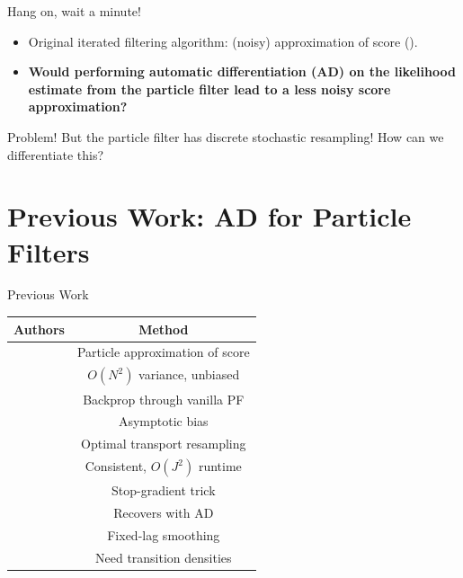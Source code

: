 \documentclass{beamer}
\begin{document}
\begin{frame}{Hang on, wait a minute!}
    \begin{itemize}
        \item Original iterated filtering algorithm: (noisy) approximation of score (\cite{ionides06-pnas}). 
        \pause
        \item \textbf{Would performing automatic differentiation (AD) on the likelihood estimate from the particle filter lead to a less noisy score approximation?}
    \end{itemize}
    \pause
    \begin{block}{Problem!}
        But the particle filter has discrete stochastic resampling! How can we differentiate this?
    \end{block}
\end{frame}

\section{Previous Work: AD for Particle Filters}


\begin{frame}{Previous Work}

    \begin{table}[h!]
        \centering
        \begin{tabular}{||c c||} 
         \hline
         Authors & Method \\ [0.5ex] 
         \hline\hline
         \cite{poyiadjis11} & Particle approximation of score
         \\ & $O(N^2)$ variance, unbiased \\
         \hline
         \cite{blei2018vsmc} & Backprop through vanilla PF \\ 
         & Asymptotic bias \\
         \hline
         \cite{corenflos21} & Optimal transport resampling \\
         & Consistent, $O(J^2)$ runtime \\
         \hline
         \cite{scibior21} & Stop-gradient trick \\ 
         & Recovers \cite{poyiadjis11} with AD \\
         \hline 
         \cite{singh22} & Fixed-lag smoothing \\ 
         & Need transition densities \\ 
         \hline
        \end{tabular}
        \label{table:lit-review}
    \end{table}
\end{frame}
\end{document}
